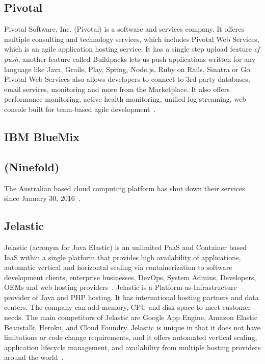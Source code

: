 \pv

\subsection{Pivotal}

Pivotal Software, Inc. (Pivotal) is a software and services
company. It offeres multiple consulting and technology services, which
includes Pivotal Web Services, which is an agile application hosting
service. It has a single step upload feature \textit{cf push}, another
feature called Buildpacks lets us push applications written for any
language like Java, Grails, Play, Spring, Node.js, Ruby on Rails,
Sinatra or Go. Pivotal Web Services also allows developers to connect
to 3rd party databases, email services, monitoring and more from the
Marketplace. It also offers performance monitoring, active health
monitoring, unified log streaming, web console built for team-based
agile development~\cite{pivotal-www}.

\subsection{IBM BlueMix}

\pv

\subsection{ (Ninefold)}

The Australian based cloud computing platform has shut down their
services since January 30, 2016~\cite{www-ninefoldSite}.

    \pv

\subsection{Jelastic}

Jelastic (acronym for Java Elastic) is an unlimited PaaS and Container
based IaaS within a single platform that provides high availability of
applications, automatic vertical and horizontal scaling via
containerization to software development clients, enterprise
businesses, DevOps, System Admins, Developers, OEMs and web hosting
providers~\cite{www-jelastic-2}. Jelastic is a
Platform-as-Infrastructure provider of Java and PHP hosting.  It has
international hosting partners and data centers. The company can add
memory, CPU and disk space to meet customer needs. The main
competitors of Jelastic are Google App Engine, Amazon Elastic
Beanstalk, Heroku, and Cloud Foundry. Jelastic is unique in that it
does not have limitations or code change requirements, and it offers
automated vertical scaling, application lifecycle management, and
availability from multiple hosting providers around the
world~\cite{www-jelastic-1}.

